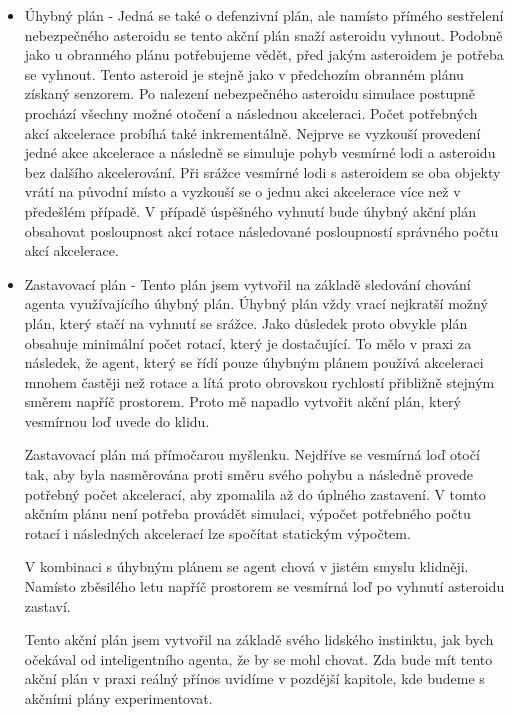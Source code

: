 \begin{itemize}
    
    \item Úhybný plán - Jedná se také o defenzivní plán, ale namísto přímého sestřelení nebezpečného asteroidu se tento akční plán snaží asteroidu vyhnout.
    Podobně jako u obranného plánu potřebujeme vědět, před jakým asteroidem je potřeba se vyhnout. Tento asteroid je stejně jako v předchozím obranném plánu získaný senzorem. Po nalezení nebezpečného asteroidu simulace postupně prochází všechny možné otočení a následnou akceleraci.
    Počet potřebných akcí akcelerace probíhá také inkrementálně. Nejprve se vyzkouší provedení jedné akce akcelerace a následně se simuluje pohyb vesmírné lodi a asteroidu bez dalšího akcelerování.
    Při srážce vesmírné lodi s asteroidem se oba objekty vrátí na původní místo a vyzkouší se o jednu akci akcelerace více než v předešlém případě.
    V případě úspěšného vyhnutí bude úhybný akční plán obsahovat posloupnost akcí rotace následované posloupností správného počtu akcí akcelerace.
    
    \item Zastavovací plán - Tento plán jsem vytvořil na základě sledování chování agenta využívajícího úhybný plán. Úhybný plán vždy vrací nejkratší možný plán, který stačí na vyhnutí se srážce. Jako důsledek proto obvykle plán obsahuje minimální počet rotací, který je dostačující.
        To mělo v praxi za následek, že agent, který se řídí pouze úhybným plánem používá akceleraci mnohem častěji než rotace a lítá proto obrovskou rychlostí přibližně stejným směrem napříč prostorem. Proto mě napadlo vytvořit akční plán, který vesmírnou loď uvede do klidu.
        \par
        Zastavovací plán má přímočarou myšlenku. 
        Nejdříve se vesmírná loď otočí tak, aby byla nasměrována proti směru svého pohybu a následně provede potřebný počet akcelerací, aby zpomalila až do úplného zastavení. 
        V tomto akčním plánu není potřeba provádět simulaci, výpočet potřebného počtu rotací i následných akcelerací lze spočítat statickým výpočtem.
        
        \par
        V kombinaci s úhybným plánem se agent chová v jistém smyslu klidněji.
        Namísto zběsilého letu napříč prostorem se vesmírná loď po vyhnutí asteroidu zastaví.            
        \par
        Tento akční plán jsem vytvořil na základě svého lidského instinktu, jak bych očekával od inteligentního agenta, že by se mohl chovat. Zda bude mít tento akční plán v praxi reálný přínos uvidíme v pozdější kapitole, kde budeme s akčními plány experimentovat.
        
        
\end{itemize}


